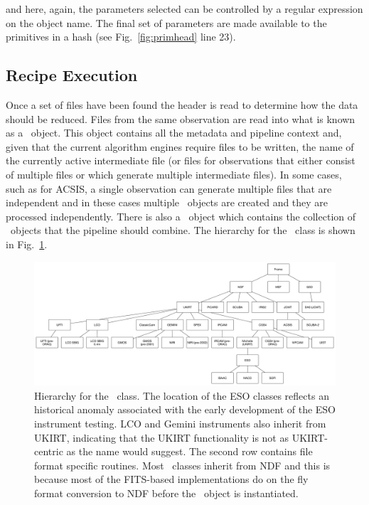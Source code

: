 \documentclass[final,authoryear,5p,times,twocolumn]{elsarticle}
\begin{document}
and here, again, the parameters selected can be controlled by a
regular expression on the object name. The final set of parameters are
made available to the primitives in a hash (see
Fig.~\ref{fig:primhead} line 23).


\subsection{Recipe Execution}
\label{sec:exec}

Once a set of files have been found the header is read to determine
how the data should be reduced. Files from the same observation are
read into what is known as a \Frame\ object. This object contains all
the metadata and pipeline context and, given that the current
algorithm engines require files to be written, the name of the
currently active intermediate file (or files for observations that
either consist of multiple files or which generate multiple
intermediate files). In some cases, such as for ACSIS, a single
observation can generate multiple files that are independent and in
these cases multiple \Frame\ objects are created and they are
processed independently. There is also a \Group\ object which
contains the collection of \Frame\ objects that the pipeline should
combine. The hierarchy for the \Frame\ class is shown in
Fig.~\ref{fig:frameclass}.

\begin{figure}
\includegraphics[width=\textwidth]{frame-class-hierarchy}
\caption{Hierarchy for the \Frame\ class. The location of the ESO
  classes reflects an historical anomaly associated with the early
  development of the ESO instrument testing. LCO and Gemini
  instruments also inherit from UKIRT, indicating that the UKIRT
  functionality is not as UKIRT-centric as the name would suggest. The
  second row contains file format specific routines. Most \Frame\
  classes inherit from NDF and this is because most of the FITS-based
  implementations do on the fly format conversion to NDF before the
  \Frame\ object is instantiated.}
\label{fig:frameclass}
\end{figure}
\end{document}
